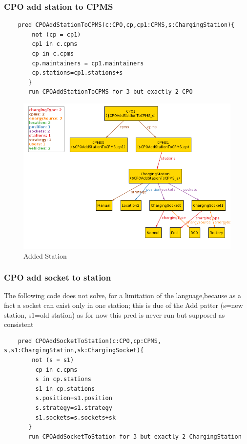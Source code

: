 \subsubsection{CPO add station to CPMS}
\begin{verbatim}
    pred CPOAddStationToCPMS(c:CPO,cp,cp1:CPMS,s:ChargingStation){
        not (cp = cp1)
        cp1 in c.cpms
        cp in c.cpms
        cp.maintainers = cp1.maintainers
        cp.stations=cp1.stations+s
       }
       run CPOAddStationToCPMS for 3 but exactly 2 CPO    
\end{verbatim}
\begin{figure}[H]
    \includegraphics[keepaspectratio, width=16cm]{Alloy/CpoAddStation.png}
    \caption{Added Station}
\end{figure}

\subsubsection{CPO add socket to station}
The following code does not solve, for a limitation of the language,because as a fact a socket can exist only in one station; this is due of the Add patter (s=new station, s1=old station) as for now this pred is never run but supposed as consistent

\begin{verbatim}
    pred CPOAddSocketToStation(c:CPO,cp:CPMS, s,s1:ChargingStation,sk:ChargingSocket){
        not (s = s1)
         cp in c.cpms
         s in cp.stations
         s1 in cp.stations
         s.position=s1.position
         s.strategy=s1.strategy
         s1.sockets=s.sockets+sk
       }
       run CPOAddSocketToStation for 3 but exactly 2 ChargingStation    
\end{verbatim}


